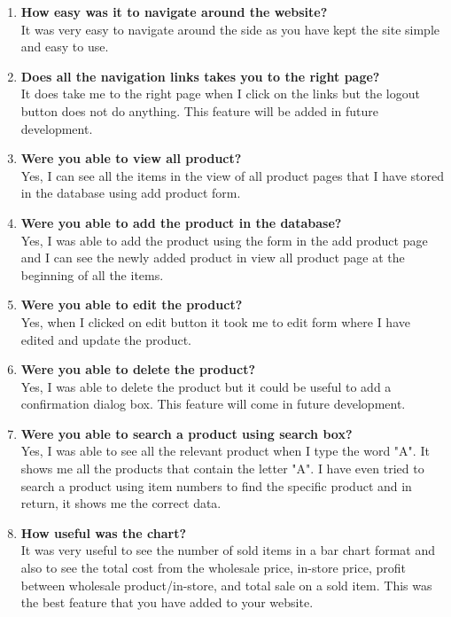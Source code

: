 \begin{enumerate}
    \item \textbf{How easy was it to navigate around the website?} \\
    It was very easy to navigate around the side as you have kept the site simple and easy to use. 
    
    \item \textbf{Does all the navigation links takes you to the right page?}\\
    It does take me to the right page when I click on the links but the logout button does not do anything. This feature will be added in future development.
    
    \item \textbf{ Were you able to view all product?}\\
    Yes, I can see all the items in the view of all product pages that I have stored in the database using add product form.
    
    \item \textbf{ Were you able to add the product in the database?}\\
    Yes, I was able to add the product using the form in the add product page and I can see the newly added product in view all product page at the beginning of all the items.
    
    \item \textbf{ Were you able to edit the product?}\\
    Yes, when I clicked on edit button it took me to edit form where I have edited and update the product.
    
    \item \textbf{ Were you able to delete the product?}\\
    Yes, I was able to delete the product but it could be useful to add a confirmation dialog box. This feature will come in future development.
    
    \item \textbf{ Were you able to search a product using search box?}\\
    Yes, I was able to see all the relevant product when I type the word "A". It shows me all the products that contain the letter "A". I have even tried to search a product using item numbers to find the specific product and in return, it shows me the correct data.
    
    \item\textbf{How useful was the chart?}\\
    It was very useful to see the number of sold items in a bar chart format and also to see the total cost from the wholesale price, in-store price, profit between wholesale product/in-store, and total sale on a sold item. This was the best feature that you have added to your website.
    

\end{enumerate}
